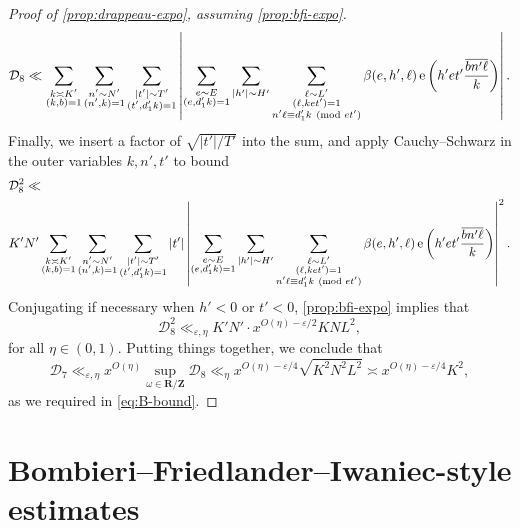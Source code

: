 \documentclass[reqno,11pt]{amsart}
\theoremstyle{definition}
\theoremstyle{remark}
\numberwithin{equation}{section}
\newcommand{\Z}{\mathbf{Z}}
\newcommand{\R}{\mathbf{R}}
\newcommand{\mD}{\mathcal{D}}
\newcommand{\e}{\textnormal{e}}
\newcommand{\eps}{\varepsilon}
\renewcommand{\bar}{\overline}
\renewcommand{\pmod}[1]{\ (\textnormal{mod } #1)}
\begin{document}
\begin{proof}[Proof of \cref{prop:drappeau-expo}, assuming \cref{prop:bfi-expo}]
\[
    \mD_8 \ll 
    \sum_{\substack{k \asymp K' \\ (k, b) = 1}} \sum_{\substack{n' \sim N' \\ (n', k) = 1}} \sum_{\substack{|t'| \sim T' \\ (t', d_1'k) = 1}} 
    \left\vert
    \sum_{\substack{e \sim E \\ (e, d_1'k) = 1}}
    \sum_{|h'| \sim H'}
    \sum_{\substack{\ell \sim L' \\ (\ell, ket') = 1 \\ n' \ell \equiv d_1' k \pmod{et'}}} 
    \beta(e, h', \ell)\, 
    \e\left(h' e t' \frac{\bar{b n' \ell}}{k}\right)
    \right\vert.
\]
Finally, we insert a factor of $\sqrt{|t'|/T'}$ into the sum, and apply Cauchy--Schwarz in the outer variables $k, n', t'$ to bound
\[
\begin{aligned}
    &\mD_8^2 \ll 
    \\
    &K' N' 
    \sum_{\substack{k \asymp K' \\ (k, b) = 1}} 
    \sum_{\substack{n' \sim N' \\ (n', k) = 1}} 
    \sum_{\substack{|t'| \sim T' \\ (t', d_1' k) = 1}} |t'| \left\vert
    \sum_{\substack{e \sim E \\ (e, d_1'k) = 1}}
    \sum_{|h'| \sim H'}
    \sum_{\substack{\ell \sim L' \\ (\ell, ket') = 1 \\ n' \ell \equiv d_1' k \pmod{et'}}} 
    \beta(e, h', \ell)\, 
    \e\left(h' e t' \frac{\bar{b n' \ell}}{k}\right)
    \right\vert^2.
\end{aligned}
\]
Conjugating if necessary when $h' < 0$ or $t' < 0$, \cref{prop:bfi-expo} implies that
\[
    \mD_8^2 \ll_{\eps,\eta} K'N' \cdot x^{O(\eta) - \eps/2} K N L^2,
\]
for all $\eta \in (0, 1)$. Putting things together, we conclude that
\[
    \mD_7 \ll_{\eps,\eta} x^{O(\eta)} \sup_{\omega \in \R/\Z} \mD_8 \ll_\eta x^{O(\eta) - \eps/4} \sqrt{K^2N^2L^2}
    \asymp x^{O(\eta) - \eps/4} K^2, 
\]
as we required in \cref{eq:B-bound}.
\end{proof}





\section{Bombieri--Friedlander--Iwaniec-style estimates} \label{sec:bfi}
\end{document}
